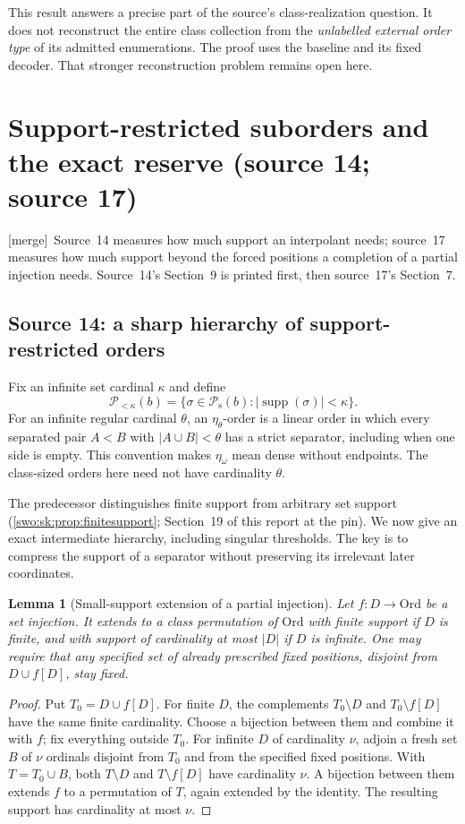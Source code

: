 \documentclass[11pt]{article}
\newtheorem{lemma}[lemma]{Lemma}
\theoremstyle{definition}
\theoremstyle{remark}
\newcommand{\Ord}{\mathrm{Ord}}
\newcommand{\Psupp}{\mathcal P_{\mathrm{s}}}
\newcommand{\supp}{\operatorname{supp}}
\newcommand{\merge}{\textsf{[merge]}}
\begin{document}
This result answers a precise part of the source's class-realization
question. It does not reconstruct the entire class collection from the
\emph{unlabelled external order type} of its admitted enumerations. The
proof uses the baseline and its fixed decoder. That stronger reconstruction
problem remains open here.

\section{Support-restricted suborders and the exact reserve (source 14; source 17)}\label{swo:viii:sec:support}

\merge\ Source~14 measures how much support an interpolant needs; source~17
measures how much support beyond the forced positions a completion of a
partial injection needs. Source~14's Section~9 is printed first, then
source~17's Section~7.

\subsection{Source 14: a sharp hierarchy of support-restricted orders}
\label{swo:tc:sec:support}
Fix an infinite set cardinal $\kappa$ and define
\[
 \mathcal P_{<\kappa}(b)=\{\sigma\in \Psupp(b):|\supp(\sigma)|<\kappa\}.
\]
For an infinite regular cardinal $\theta$, an $\eta_\theta$-order is a
linear order in which every separated pair $A<B$ with
$|A\cup B|<\theta$ has a strict separator, including when one side is
empty. This convention makes $\eta_\omega$ mean dense without endpoints.
The class-sized orders here need not have cardinality $\theta$.

The predecessor distinguishes finite support from arbitrary set support
(\cref{swo:sk:prop:finitesupport}; Section~19 of this report at the pin). We now give an
exact intermediate hierarchy, including singular thresholds. The key
is to compress the support of a separator without preserving its
irrelevant later coordinates.

\begin{lemma}[Small-support extension of a partial injection]
\label{swo:tc:lem:partialextension}
Let $f:D\to\Ord$ be a set injection. It extends to a class permutation
of $\Ord$ with finite support if $D$ is finite, and with support of
cardinality at most $|D|$ if $D$ is infinite. One may require that any
specified set of already prescribed fixed positions, disjoint from
$D\cup f[D]$, stay fixed.
\end{lemma}
\begin{proof}
Put $T_0=D\cup f[D]$. For finite $D$, the complements $T_0\setminus D$
and $T_0\setminus f[D]$ have the same finite cardinality. Choose a
bijection between them and combine it with $f$; fix everything outside
$T_0$. For infinite $D$ of cardinality $\nu$, adjoin a fresh set $B$
of $\nu$ ordinals disjoint from $T_0$ and from the specified fixed
positions. With $T=T_0\cup B$, both $T\setminus D$ and
$T\setminus f[D]$ have cardinality $\nu$. A bijection between them
extends $f$ to a permutation of $T$, again extended by the identity.
The resulting support has cardinality at most $\nu$.
\end{proof}
\end{document}

